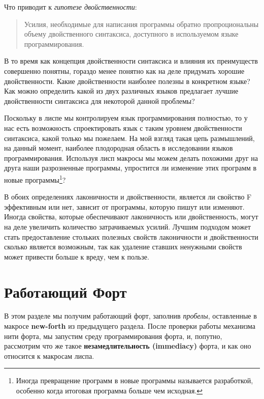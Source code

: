 Что приводит к \emph{гипотезе двойственности}:

\begin{quote}
Усилия, необходимые для написания программы обратно пропроциональны объему двойственного синтаксиса, доступного в используемом языке программирования.
\end{quote}

В то время как концепция двойственности синтаксиса и влияния их преимуществ совершенно понятны, гораздо менее понятно как на деле придумать хорошие двойственности. Какие двойственности наиболее полезны в конкретном языке? Как можно определить какой из двух различных языков предлагает лучшие двойственности синтаксиса для некоторой данной проблемы?

Поскольку в лиспе мы контролируем язык программирования полностью, то у нас есть возможность спроектировать язык с таким уровнем двойственности синтаксиса, какой только мы пожелаем. На мой взгляд такая цепь размышлений, на данный момент, наиболее плодородная область в исследовании языков программирования. Используя лисп макросы мы можем делать похожими друг на друга наши разрозненные программы, упростится ли изменение этих программ в новые программы\footnote{Иногда превращение программ в новые программы называется разработкой, особенно когда итоговая программа больше чем исходная.}?

В обоих определениях лаконичности и двойственности, является ли свойство F эффективным или нет, зависит от программы, которую пишут или изменяют. Иногда свойства, которые обеспечивают лаконичность или двойственность, могут на деле увеличить количество затрачиваемых усилий. Лучшим подходом может стать предоставление стольких полезных свойств лаконичности и двойственности сколько является возможным, так как удаление ставших ненужными свойств может привести больше к вреду, чем к пользе.

\section{Работающий Форт}\label{section_going_forth}

В этом разделе мы получим работающий форт, заполнив \emph{пробелы}, оставленные в макросе \textbf{new-forth} из предыдущего раздела. После проверки работы механизма нити форта, мы запустим среду программирования форта, и, попутно, рассмотрим что же такое \textbf{незамедлительность (immediacy)} форта, и как оно относится к макросам лиспа.

